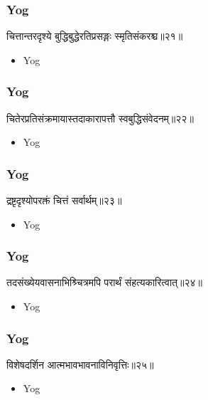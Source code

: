 \begin{frame}[fragile]\frametitle{Yog}
\begin{sanskrit}
चित्तान्तरदृश्ये बुद्धिबुद्धेरतिप्रसङ्गः स्मृतिसंकरश्च॥२१॥
\end{sanskrit}
	\begin{itemize}
	\item Yog 
	\end{itemize}
\end{frame}


\begin{frame}[fragile]\frametitle{Yog}
\begin{sanskrit}
चितेरप्रतिसंक्रमायास्तदाकारापत्तौ स्वबुद्धिसंवेदनम्॥२२॥
\end{sanskrit}
	\begin{itemize}
	\item Yog 
	\end{itemize}
\end{frame}

\begin{frame}[fragile]\frametitle{Yog}
\begin{sanskrit}
द्रष्टृदृश्योपरक्तं चित्तं सर्वार्थम्॥२३॥
\end{sanskrit}
	\begin{itemize}
	\item Yog 
	\end{itemize}
\end{frame}


\begin{frame}[fragile]\frametitle{Yog}
\begin{sanskrit}
तदसंख्येयवासनाभिश्र्चित्रमपि परार्थं संहत्यकारित्वात्॥२४॥
\end{sanskrit}
	\begin{itemize}
	\item Yog 
	\end{itemize}
\end{frame}


\begin{frame}[fragile]\frametitle{Yog}
\begin{sanskrit}
विशेषदर्शिन आत्मभावभावनाविनिवृत्तिः॥२५॥
\end{sanskrit}
	\begin{itemize}
	\item Yog 
	\end{itemize}
\end{frame}


